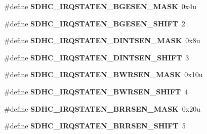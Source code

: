 \begin{DoxyCompactItemize}
\item 
\#define {\bfseries S\+D\+H\+C\+\_\+\+I\+R\+Q\+S\+T\+A\+T\+E\+N\+\_\+\+B\+G\+E\+S\+E\+N\+\_\+\+M\+A\+SK}~0x4u\hypertarget{group__SDHC__Register__Masks_ga46d5c9b348b825831e0fb397ede43a9a}{}\label{group__SDHC__Register__Masks_ga46d5c9b348b825831e0fb397ede43a9a}

\item 
\#define {\bfseries S\+D\+H\+C\+\_\+\+I\+R\+Q\+S\+T\+A\+T\+E\+N\+\_\+\+B\+G\+E\+S\+E\+N\+\_\+\+S\+H\+I\+FT}~2\hypertarget{group__SDHC__Register__Masks_ga6fa2e791021ce11cf32108b91c82ba6e}{}\label{group__SDHC__Register__Masks_ga6fa2e791021ce11cf32108b91c82ba6e}

\item 
\#define {\bfseries S\+D\+H\+C\+\_\+\+I\+R\+Q\+S\+T\+A\+T\+E\+N\+\_\+\+D\+I\+N\+T\+S\+E\+N\+\_\+\+M\+A\+SK}~0x8u\hypertarget{group__SDHC__Register__Masks_ga3e226429fe18b447810a75373b0e4e80}{}\label{group__SDHC__Register__Masks_ga3e226429fe18b447810a75373b0e4e80}

\item 
\#define {\bfseries S\+D\+H\+C\+\_\+\+I\+R\+Q\+S\+T\+A\+T\+E\+N\+\_\+\+D\+I\+N\+T\+S\+E\+N\+\_\+\+S\+H\+I\+FT}~3\hypertarget{group__SDHC__Register__Masks_ga7a2afc379b13fa392c324274ccf3c313}{}\label{group__SDHC__Register__Masks_ga7a2afc379b13fa392c324274ccf3c313}

\item 
\#define {\bfseries S\+D\+H\+C\+\_\+\+I\+R\+Q\+S\+T\+A\+T\+E\+N\+\_\+\+B\+W\+R\+S\+E\+N\+\_\+\+M\+A\+SK}~0x10u\hypertarget{group__SDHC__Register__Masks_gab61d7d78bdcc89f1ae03332eae100736}{}\label{group__SDHC__Register__Masks_gab61d7d78bdcc89f1ae03332eae100736}

\item 
\#define {\bfseries S\+D\+H\+C\+\_\+\+I\+R\+Q\+S\+T\+A\+T\+E\+N\+\_\+\+B\+W\+R\+S\+E\+N\+\_\+\+S\+H\+I\+FT}~4\hypertarget{group__SDHC__Register__Masks_ga8d3fbb4324645ec6117b77a592000680}{}\label{group__SDHC__Register__Masks_ga8d3fbb4324645ec6117b77a592000680}

\item 
\#define {\bfseries S\+D\+H\+C\+\_\+\+I\+R\+Q\+S\+T\+A\+T\+E\+N\+\_\+\+B\+R\+R\+S\+E\+N\+\_\+\+M\+A\+SK}~0x20u\hypertarget{group__SDHC__Register__Masks_ga158351e2d7c3b799b7e1de2231b2721e}{}\label{group__SDHC__Register__Masks_ga158351e2d7c3b799b7e1de2231b2721e}

\item 
\#define {\bfseries S\+D\+H\+C\+\_\+\+I\+R\+Q\+S\+T\+A\+T\+E\+N\+\_\+\+B\+R\+R\+S\+E\+N\+\_\+\+S\+H\+I\+FT}~5\hypertarget{group__SDHC__Register__Masks_ga994be2975fe8bfcfa36b677c8857764a}{}\label{group__SDHC__Register__Masks_ga994be2975fe8bfcfa36b677c8857764a}


\end{DoxyCompactItemize}
